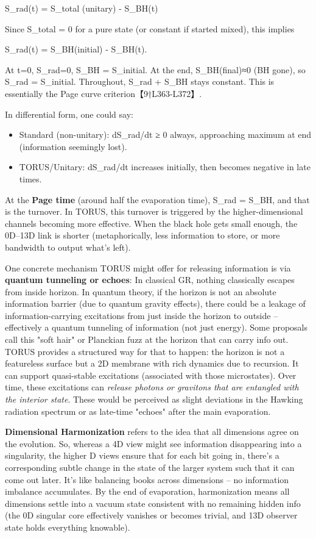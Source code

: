 \documentclass[]{article}
\begin{document}
S\_rad(t) = S\_total (unitary) - S\_BH(t)

Since S\_total = 0 for a pure state (or constant if started mixed), this
implies

S\_rad(t) = S\_BH(initial) - S\_BH(t).

At t=0, S\_rad=0, S\_BH = S\_initial. At the end, S\_BH(final)≈0 (BH
gone), so S\_rad = S\_initial. Throughout, S\_rad + S\_BH stays
constant. This is essentially the Page curve criterion【9†L363-L372】.

In differential form, one could say:

\begin{itemize}
\item
  Standard (non-unitary): dS\_rad/dt ≥ 0 always, approaching maximum at
  end (information seemingly lost).
\item
  TORUS/Unitary: dS\_rad/dt increases initially, then becomes negative
  in late times.
\end{itemize}

At the \textbf{Page time} (around half the evaporation time), S\_rad =
S\_BH, and that is the turnover. In TORUS, this turnover is triggered by
the higher-dimensional channels becoming more effective. When the black
hole gets small enough, the 0D--13D link is shorter (metaphorically,
less information to store, or more bandwidth to output what's left).

One concrete mechanism TORUS might offer for releasing information is
via \textbf{quantum tunneling or echoes}: In classical GR, nothing
classically escapes from inside horizon. In quantum theory, if the
horizon is not an absolute information barrier (due to quantum gravity
effects), there could be a leakage of information-carrying excitations
from just inside the horizon to outside -- effectively a quantum
tunneling of information (not just energy). Some proposals call this
"soft hair" or Planckian fuzz at the horizon that can carry info out.
TORUS provides a structured way for that to happen: the horizon is not a
featureless surface but a 2D membrane with rich dynamics due to
recursion. It can support quasi-stable excitations (associated with
those microstates). Over time, these excitations can \emph{release
photons or gravitons that are entangled with the interior state}. These
would be perceived as slight deviations in the Hawking radiation
spectrum or as late-time "echoes" after the main evaporation.

\textbf{Dimensional Harmonization} refers to the idea that all
dimensions agree on the evolution. So, whereas a 4D view might see
information disappearing into a singularity, the higher D views ensure
that for each bit going in, there's a corresponding subtle change in the
state of the larger system such that it can come out later. It's like
balancing books across dimensions -- no information imbalance
accumulates. By the end of evaporation, harmonization means all
dimensions settle into a vacuum state consistent with no remaining
hidden info (the 0D singular core effectively vanishes or becomes
trivial, and 13D observer state holds everything knowable).
\end{document}
